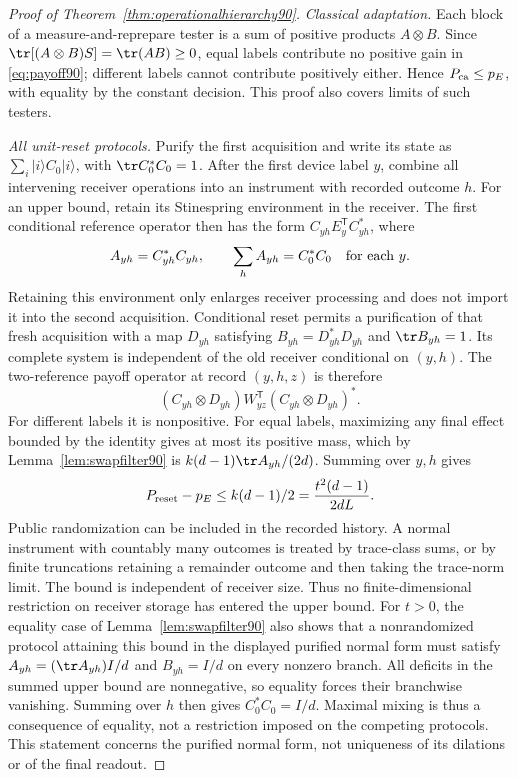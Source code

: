 \begin{proof}[Proof of Theorem~\ref{thm:operationalhierarchy90}]
\emph{Classical adaptation.}
Each block of a measure-and-reprepare tester is a sum of positive
products $A\otimes B$.  Since
$\tr[(A\otimes B)S]=\tr(AB)\ge0$, equal labels contribute no positive
gain in \eqref{eq:payoff90}; different labels cannot contribute positively
either.  Hence $P_{\rm ca}\le p_E$, with equality by the constant decision.
This proof also covers limits of such testers.

\emph{All unit-reset protocols.}
Purify the first acquisition and write its state as
$\sum_i|i\rangle C_0|i\rangle$, with $\tr C_0^*C_0=1$.
After the first device label $y$, combine all intervening receiver
operations into an instrument with recorded outcome $h$.  For an upper
bound, retain its Stinespring environment in the receiver.  The first
conditional reference operator then has the form
$C_{yh}E_y^{\mathsf T}C_{yh}^*$, where
\[
 A_{yh}=C_{yh}^*C_{yh},\qquad
 \sum_h A_{yh}=C_0^*C_0\quad\hbox{for each }y.
\]
Retaining this environment only enlarges receiver processing and does
not import it into the second acquisition.  Conditional reset permits
a purification of that fresh acquisition with a map $D_{yh}$ satisfying
$B_{yh}=D_{yh}^*D_{yh}$ and $\tr B_{yh}=1$.
Its complete system is independent of the old receiver conditional on
$(y,h)$.  The two-reference payoff operator at record $(y,h,z)$ is
therefore
\[
 (C_{yh}\otimes D_{yh})W_{yz}^{\mathsf T}
                         (C_{yh}\otimes D_{yh})^*.
\]
For different labels it is nonpositive.  For equal labels, maximizing
any final effect bounded by the identity gives at most its positive
mass, which by Lemma~\ref{lem:swapfilter90} is
$k(d-1)\tr A_{yh}/(2d)$.  Summing over $y,h$ gives
\[
 P_{\rm reset}-p_E\le k(d-1)/2=\frac{t^2(d-1)}{2dL}.
\]
Public randomization can be included in the recorded history.  A normal
instrument with countably many outcomes is treated by trace-class
sums, or by finite truncations retaining a remainder outcome and then
taking the trace-norm limit.  The bound is independent of receiver
size.  Thus no finite-dimensional restriction on receiver storage has
entered the upper bound.
For $t>0$, the equality case of Lemma~\ref{lem:swapfilter90} also shows
that a nonrandomized protocol attaining this bound in the displayed
purified normal form must satisfy
$A_{yh}=(\tr A_{yh})I/d$ and $B_{yh}=I/d$ on every nonzero branch.
All deficits in the summed upper bound are nonnegative, so equality
forces their branchwise vanishing.  Summing over $h$ then gives
$C_0^*C_0=I/d$.  Maximal mixing is thus a consequence of equality,
not a restriction imposed on the competing protocols.  This statement
concerns the purified normal form, not uniqueness of its dilations
or of the final readout.


\end{proof}
